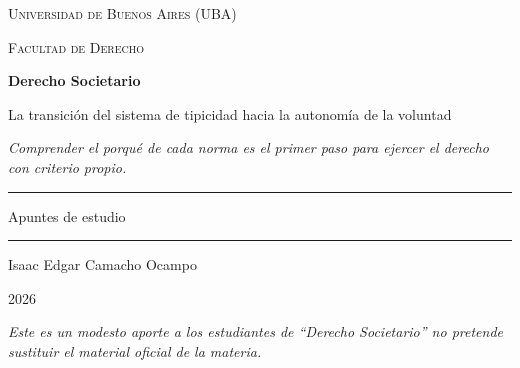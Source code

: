 \documentclass[12pt,oneside]{book}
\newcommand{\universidad}{Universidad de Buenos Aires (UBA)}
\newcommand{\facultad}{Facultad de Derecho}
\newcommand{\materia}{Derecho Societario}
\newcommand{\titulo}{La transición del sistema de tipicidad hacia la autonomía de la voluntad}
\newcommand{\autor}{Isaac Edgar Camacho Ocampo}
\newcommand{\anio}{2026}
\begin{document}
\begin{titlepage}

\thispagestyle{empty}

\begin{center}

\vspace*{1cm}

{\large \textsc{\universidad}}

\vspace{0.2cm}

{\large \textsc{\facultad}}

\vspace{3cm}

{\Huge \textbf{\materia}}

\vspace{1cm}

{\LARGE \titulo}

\vspace{0.8cm}

\textit{Comprender el porqué de cada norma es el primer paso para ejercer el derecho con criterio propio.}

\vspace{1.2cm}

\rule{0.70\textwidth}{0.5pt}

\vspace{0.5cm}

{\large Apuntes de estudio}

\vspace{0.5cm}

\rule{0.70\textwidth}{0.5pt}

\vfill

{\large \autor}

\vspace{0.3cm}

{\large \anio}

\end{center}

\vfill

\begin{flushleft}
\textit{Este es un modesto aporte a los estudiantes de ``Derecho Societario'' no pretende sustituir el material oficial de la materia.}
\end{flushleft}

\end{titlepage}

\tableofcontents

\end{document}
